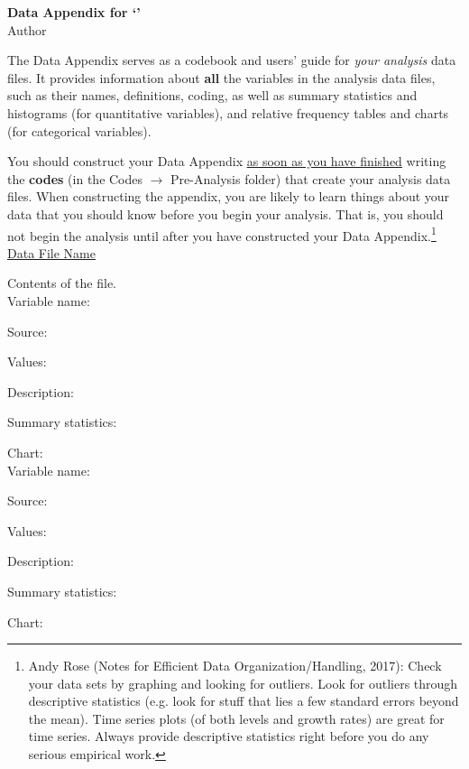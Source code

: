 \documentclass[12pt,a4paper]{article}
\begin{document}
	\begin{center}
		\textbf{\Large Data Appendix for `'}\\
		\medskip
		Author
	\end{center}

The Data Appendix serves as a codebook and users' guide for \textit{your analysis} data files. It provides information about \textbf{all} the variables in the analysis data files, such as their names, definitions, coding, as well as summary statistics and histograms (for quantitative variables), and relative frequency tables and charts (for categorical variables).

You should construct your Data Appendix \underline{as soon as you have finished} writing the \textbf{codes} (in the Codes \(\rightarrow\) Pre-Analysis folder) that create your analysis data files.
When constructing the appendix, you are likely to learn things about your data that you should know before you begin your analysis. That is, you should not begin the analysis until after you have constructed your Data Appendix.\footnote{Andy Rose (Notes for Efficient Data Organization/Handling, 2017): Check your data sets by graphing and looking for outliers. Look for outliers through descriptive statistics (e.g. look for stuff that lies a few standard errors beyond the mean). Time series plots (of both levels and growth rates) are great for time series. Always provide descriptive statistics right before you do any serious empirical work.}\\

\underline{Data File Name}

Contents of the file.\\

Variable name:

Source:

Values:

Description:

Summary statistics:

Chart:\\


Variable name:

Source:

Values:

Description:

Summary statistics:

Chart:\\
\end{document}
